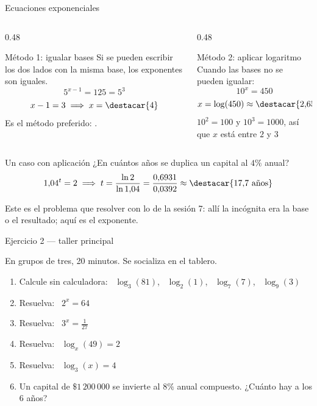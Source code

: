 \documentclass[aspectratio=169,10pt]{beamer}
\begin{document}
\begin{frame}{Ecuaciones exponenciales}
  \scriptsize
  \begin{columns}[T,onlytextwidth]
    \begin{column}{0.48\textwidth}
      \begin{block}{Método 1: igualar bases}
        \tiny
        Si se pueden escribir los dos lados con la misma base, los exponentes
        son iguales.
        \[ 5^{x-1} = 125 = 5^{3} \]
        \[ x-1 = 3 \;\Longrightarrow\; x = \destacar{4} \]
        Es el método preferido: .
      \end{block}
    \end{column}
    \begin{column}{0.48\textwidth}
      \begin{block}{Método 2: aplicar logaritmo}
        \tiny
        Cuando las bases no se pueden igualar:
        \[ 10^{x} = 450 \]
        \[ x = \log(450) \approx \destacar{2{,}6532} \]
         $10^{2}=100$ y $10^{3}=1000$, así que $x$ está entre
        $2$ y $3$ \checkmark
      \end{block}
    \end{column}
  \end{columns}

  \vspace{0.12cm}
  \begin{exampleblock}{Un caso con aplicación}
    \tiny
    ¿En cuántos años se duplica un capital al $4\%$ anual?
    \[ 1{,}04^{t} = 2
       \;\Longrightarrow\;
       t = \frac{\ln 2}{\ln 1{,}04}
       = \frac{0{,}6931}{0{,}0392} \approx \destacar{17{,}7\ \text{años}} \]
  \end{exampleblock}

  \vspace{0.05cm}
  {\tiny\color{uniGris} Este es el problema que  resolver con
  lo de la sesión 7: allí la incógnita era la base o el resultado; aquí es el
  exponente. }
\end{frame}

\begin{frame}{Ejercicio 2 — taller principal}
  \begin{alertblock}{En grupos de tres, 20 minutos. Se socializa en el tablero.}
    \scriptsize
    \begin{enumerate}\setlength{\itemsep}{0.0cm}
      \item Calcule sin calculadora: \ $\log_{3}(81)$, \ $\log_{2}(1)$, \
            $\log_{7}(7)$, \ $\log_{9}(3)$
      \item Resuelva: \ $2^{x} = 64$
      \item Resuelva: \ $3^{x} = \tfrac{1}{27}$
      \item Resuelva: \ $\log_{x}(49) = 2$
      \item Resuelva: \ $\log_{3}(x) = 4$
      \item Un capital de $\$1\,200\,000$ se invierte al $8\%$ anual
            compuesto. ¿Cuánto hay a los $6$ años?
    \end{enumerate}
  \end{alertblock}
\end{frame}
\end{document}
